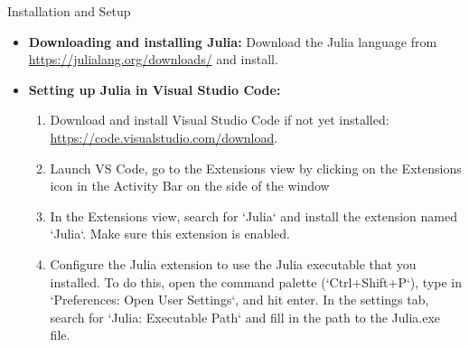 \documentclass[aspectratio=169]{beamer}
\begin{document}
\begin{frame}{Installation and Setup}

\begin{itemize}
\item \textbf{Downloading and installing Julia:} Download the Julia language from \url{https://julialang.org/downloads/} and install.

\vspace{0.5cm}
\item \textbf{Setting up Julia in Visual Studio Code:}

    \begin{enumerate}
        \item Download and install Visual Studio Code if not yet installed: \url{https://code.visualstudio.com/download}.
        
        \item Launch VS Code, go to the Extensions view by clicking on the Extensions icon in the Activity Bar on the side of the window

        \item In the Extensions view, search for `Julia` and install the extension named `Julia`. Make sure this extension is enabled.

        \item Configure the Julia extension to use the Julia executable that you installed. To do this, open the command palette (`Ctrl+Shift+P`), type in `Preferences: Open User Settings`, and hit enter. In the settings tab, search for `Julia: Executable Path` and fill in the path to the Julia.exe file.

    \end{enumerate}
\end{itemize}

\end{frame}
\end{document}
